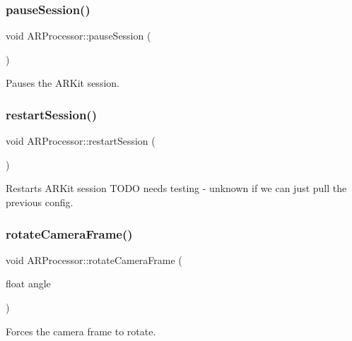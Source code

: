 \subsubsection{\texorpdfstring{pause\+Session()}{pauseSession()}}
{\footnotesize\ttfamily void A\+R\+Processor\+::pause\+Session (\begin{DoxyParamCaption}{ }\end{DoxyParamCaption})}



Pauses the A\+R\+Kit session. 

\mbox{\label{class_a_r_processor_a121cd3925743680196771ce07058d52e}} 
\subsubsection{\texorpdfstring{restart\+Session()}{restartSession()}}
{\footnotesize\ttfamily void A\+R\+Processor\+::restart\+Session (\begin{DoxyParamCaption}{ }\end{DoxyParamCaption})}

Restarts A\+R\+Kit session T\+O\+DO needs testing -\/ unknown if we can just pull the previous config. \mbox{\label{class_a_r_processor_a2514281144c680e13c02562c74746ceb}} 
\subsubsection{\texorpdfstring{rotate\+Camera\+Frame()}{rotateCameraFrame()}}
{\footnotesize\ttfamily void A\+R\+Processor\+::rotate\+Camera\+Frame (\begin{DoxyParamCaption}\item[{float}]{angle }\end{DoxyParamCaption})}



Forces the camera frame to rotate. 

\mbox{\label{class_a_r_processor_a2ffd8b9518388be29eba6affe4d4d152}} 
